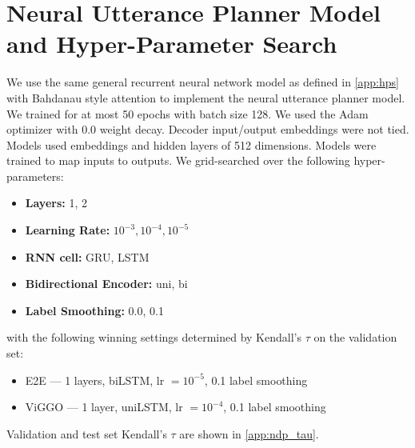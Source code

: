 \section{Neural Utterance Planner Model and Hyper-Parameter Search}
\label{app:ndp}



We use the same general recurrent neural network 
model as defined in \autoref{app:hps} with Bahdanau style attention
\cite{bahdanau2015}
to implement the neural utterance planner model. 
We trained for at most 50 epochs
with batch size 128. We used the Adam optimizer with 0.0 weight decay. Decoder input/output 
embeddings
were not tied.
Models used embeddings and hidden layers of 512 dimensions.
Models were trained to map  inputs to  outputs.
We grid-searched over the following hyper-parameters:
\begin{itemize}
    \item \textbf{Layers:} 1, 2 
    \item \textbf{Learning Rate:} $10^{-3}, 10^{-4}, 10^{-5}$ 
    \item \textbf{RNN cell:} GRU, LSTM
    \item \textbf{Bidirectional Encoder:} uni, bi
    \item \textbf{Label Smoothing:} 0.0, 0.1
\end{itemize}
with the following winning settings determined by Kendall's $\tau$
on the validation set:

\begin{itemize}
    \item E2E --- 1 layers, biLSTM, lr $=10^{-5}$, 0.1 label smoothing
    \item ViGGO --- 1 layer, uniLSTM, lr $=10^{-4}$, 0.1 label smoothing
\end{itemize}


Validation and test set Kendall's $\tau$ are shown in \autoref{app:ndp_tau}.

%
